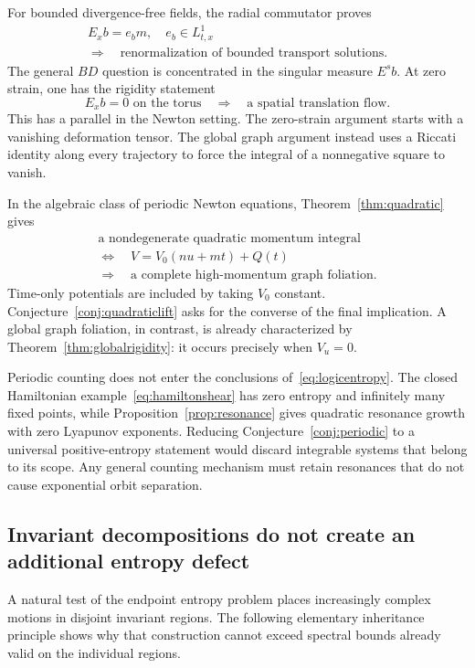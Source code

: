 \documentclass[review,12pt,times,a4paper,nopreprintline]{elsarticle}
\theoremstyle{plain}
\theoremstyle{definition}
\theoremstyle{remark}
\numberwithin{equation}{section}
\begin{document}
For bounded divergence-free fields, the radial commutator proves
\begin{equation}\label{eq:logicbd}
 \begin{gathered}
 E_xb=e_bm,\quad e_b\in L^1_{t,x}\\
 \Longrightarrow\quad
 \text{renormalization of bounded transport solutions}.
 \end{gathered}
\end{equation}
The general $BD$ question is concentrated in the singular measure $E^sb$. At zero strain, one has the rigidity statement
\[
 E_xb=0\text{ on the torus}
 \quad\Longrightarrow\quad
 \text{a spatial translation flow}.
\]
This has a parallel in the Newton setting. The zero-strain argument starts with a vanishing deformation tensor. The global graph argument instead uses a Riccati identity along every trajectory to force the integral of a nonnegative square to vanish.

In the algebraic class of periodic Newton equations, Theorem~\ref{thm:quadratic} gives
\begin{equation}\label{eq:logicnewton}
 \begin{gathered}
 \text{a nondegenerate quadratic momentum integral}\\
 \Longleftrightarrow\quad V=V_0(nu+mt)+Q(t)\\
 \Longrightarrow\quad\text{a complete high-momentum graph foliation}.
 \end{gathered}
\end{equation}
Time-only potentials are included by taking $V_0$ constant. Conjecture~\ref{conj:quadraticlift} asks for the converse of the final implication. A global graph foliation, in contrast, is already characterized by Theorem~\ref{thm:globalrigidity}: it occurs precisely when $V_u=0$.

Periodic counting does not enter the conclusions of~\eqref{eq:logicentropy}. The closed Hamiltonian example~\eqref{eq:hamiltonshear} has zero entropy and infinitely many fixed points, while Proposition~\ref{prop:resonance} gives quadratic resonance growth with zero Lyapunov exponents. Reducing Conjecture~\ref{conj:periodic} to a universal positive-entropy statement would discard integrable systems that belong to its scope. Any general counting mechanism must retain resonances that do not cause exponential orbit separation.

\subsection{Invariant decompositions do not create an additional entropy defect}
A natural test of the endpoint entropy problem places increasingly complex motions in disjoint invariant regions. The following elementary inheritance principle shows why that construction cannot exceed spectral bounds already valid on the individual regions.
\end{document}
